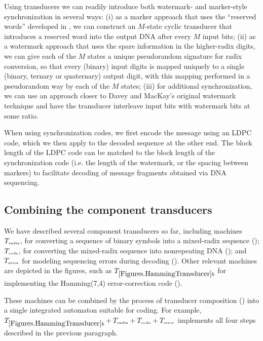 \documentclass[english]{article}
\begin{document}
Using transducers we can readily introduce both watermark- and marker-style synchronization in several ways:
(i) as a marker approach that uses the ``reserved words'' developed in ,
we can construct an $M$-state cyclic transducer that introduces a reserved word into the output DNA after every $M$ input bits;
(ii) as a watermark approach that uses the spare information in the higher-radix digits, we can give each of the $M$ states a unique pseudorandom signature for radix conversion,
so that every (binary) input digits is mapped uniquely to a single (binary, ternary or quaternary) output digit,
with this mapping performed in a pseudorandom way by each of the $M$ states;
(iii) for additional synchronization, we can use an approach closer to Davey and MacKay's original watermark technique
and have the transducer interleave input bits with watermark bits at some ratio.

When using synchronization codes, we first encode the message using an LDPC code,
which we then apply to the decoded sequence at the other end.
The block length of the LDPC code can be matched to the block length of the synchronization code
(i.e. the length of the watermark, or the spacing between markers)
to facilitate decoding of message fragments obtained via DNA sequencing.

\subsection{Combining the component transducers}

We have described several component transducers so far,
including machines
$T_{\mbox{\tiny radix}}$, for converting a sequence of binary symbols
into a mixed-radix sequence ();
$T_{\mbox{\tiny code}}$, for converting the mixed-radix sequence into nonrepeating DNA
();
and $T_{\mbox{\tiny error}}$ for modeling sequencing errors during decoding
().
Other relevant machines are depicted in the figures,
such as $\hammingsevenfour$ for implementing the Hamming(7,4) error-correction code
().

These machines can be combined by the process of transducer composition () into a single integrated automaton suitable for coding.
For example, $\hammingsevenfour \transcomp \transrad \transcomp \transcoder \transcomp \transerror$
implements all four steps described in the previous paragraph.
\end{document}
